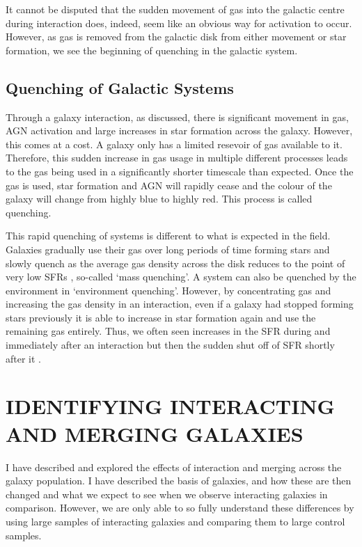It cannot be disputed that the sudden movement of gas into the galactic centre during interaction does, indeed, seem like an obvious way for activation to occur. However, as gas is removed from the galactic disk from either movement or star formation, we see the beginning of quenching in the galactic system. 

\subsection{Quenching of Galactic Systems}
\noindent Through a galaxy interaction, as discussed, there is significant movement in gas, AGN activation and large increases in star formation across the galaxy. However, this comes at a cost. A galaxy only has a limited resevoir of gas available to it. Therefore, this sudden increase in gas usage in multiple different processes leads to the gas being used in a significantly shorter timescale than expected. Once the gas is used, star formation and AGN will rapidly cease and the colour of the galaxy will change from highly blue to highly red. This process is called quenching.

This rapid quenching of systems is different to what is expected in the field. Galaxies gradually use their gas over long periods of time forming stars and slowly quench as the average gas density across the disk reduces to the point of very low SFRs \citep{2010ApJ...721..193P}, so-called `mass quenching'. A system can also be quenched by the environment in `environment quenching'. However, by concentrating gas and increasing the gas density in an interaction, even if a galaxy had stopped forming stars previously it is able to increase in star formation again and use the remaining gas entirely. Thus, we often seen increases in the SFR during and immediately after an interaction but then the sudden shut off of SFR shortly after it \citep{2022MNRAS.517L..92E}.

\section{IDENTIFYING INTERACTING AND MERGING GALAXIES}
\noindent I have described and explored the effects of interaction and merging across the galaxy population. I have described the basis of galaxies, and how these are then changed and what we expect to see when we observe interacting galaxies in comparison. However, we are only able to so fully understand these differences by using large samples of interacting galaxies and comparing them to large control samples.

